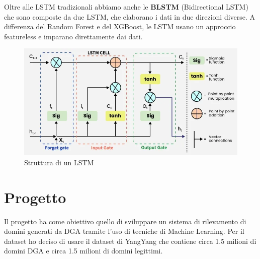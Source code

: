 \documentclass[12pt,a4paper,openright,twoside]{book}
\begin{document}
\noindent Oltre alle LSTM tradizionali abbiamo anche le \textbf{BLSTM} (Bidirectional LSTM) che sono
composte da due LSTM, che elaborano i dati in due direzioni diverse.
A differenza del Random Forest e del XGBoost, le LSTM usano un approccio featureless e imparano
direttamente dai dati.

\begin{figure}[H]
    \centering
    \includegraphics[width=.8\linewidth]{figures/gate_of_lstm.png}
    \caption{Struttura di un LSTM \cite{LSTM_image}}
    \label{fig:LSTM}
\end{figure}


\chapter{Progetto}
Il progetto ha come obiettivo quello di sviluppare un sistema
di rilevamento di domini generati da DGA tramite
l'uso di tecniche di Machine Learning. 
Per il dataset ho deciso di usare il dataset di YangYang \cite{dataset_yangyang}
che contiene circa 1.5 milioni di domini DGA e circa 1.5 milioni di domini legittimi.
\end{document}
